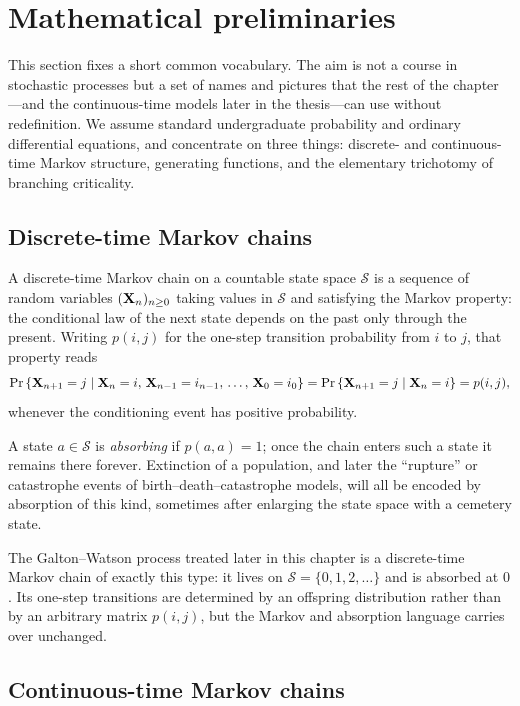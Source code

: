 \section{Mathematical preliminaries}
\label{sec:preliminaries}

This section fixes a short common vocabulary. The aim is not a course in stochastic processes but a set of names and pictures that the rest of the chapter---and the continuous-time models later in the thesis---can use without redefinition. We assume standard undergraduate probability and ordinary differential equations, and concentrate on three things: discrete- and continuous-time Markov structure, generating functions, and the elementary trichotomy of branching criticality.

\subsection{Discrete-time Markov chains}
\label{sec:dtmc}

A discrete-time Markov chain on a countable state space $\mathcal{S}$ is a sequence of random variables $({\bf X}_n)_{n\geq 0}$ taking values in $\mathcal{S}$ and satisfying the Markov property: the conditional law of the next state depends on the past only through the present. Writing $p(i,j)$ for the one-step transition probability from $i$ to $j$, that property reads
\[
{\text{Pr}\left\{{\bf X}_{n+1}=j \mid {\bf X}_n=i,\, {\bf X}_{n-1}=i_{n-1},\,\ldots,\, {\bf X}_0=i_0\right\}}
=
{\text{Pr}\left\{{\bf X}_{n+1}=j \mid {\bf X}_n=i\right\}}
=
p(i,j),
\]
whenever the conditioning event has positive probability.

A state $a\in\mathcal{S}$ is \emph{absorbing} if $p(a,a)=1$; once the chain enters such a state it remains there forever. Extinction of a population, and later the ``rupture'' or catastrophe events of birth--death--catastrophe models, will all be encoded by absorption of this kind, sometimes after enlarging the state space with a cemetery state.

The Galton--Watson process treated later in this chapter is a discrete-time Markov chain of exactly this type: it lives on $\mathcal{S}=\{0,1,2,\ldots\}$ and is absorbed at $0$. Its one-step transitions are determined by an offspring distribution rather than by an arbitrary matrix $p(i,j)$, but the Markov and absorption language carries over unchanged.

\subsection{Continuous-time Markov chains}
\label{sec:ctmc}

